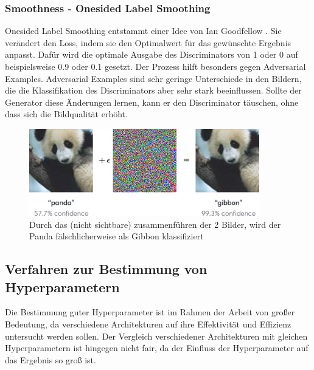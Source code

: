 \subsubsection{Smoothness - Onesided Label Smoothing}
Onesided Label Smoothing entstammt einer Idee von Ian Goodfellow \cite{ian-goodfellow-onesided-label-smoothing}.
Sie verändert den Loss, indem sie den Optimalwert für das gewünschte Ergebnis anpasst.
Dafür wird die optimale Ausgabe des Discriminators von 1 oder 0 auf beispielsweise 0.9 oder 0.1 gesetzt.
Der Prozess hilft besonders gegen Adversarial Examples.
Adversarial Examples sind sehr geringe Unterschiede in den Bildern, die die Klassifikation des Discriminators aber sehr stark beeinflussen.
Sollte der Generator diese Änderungen lernen, kann er den Discriminator täuschen, ohne dass sich die Bildqualität erhöht.

\begin{figure}[H]
	\centering
	\includegraphics[width=10cm]{kapitel/2_stand_der_technik/img/adversrial-example.png}
	\caption[Adversarial Example]{Durch das (nicht sichtbare) zusammenführen der 2 Bilder, wird der Panda fälschlicherweise als Gibbon klassifiziert}
	\label{smoothness-adversarial-example}
\end{figure}


\subsection{Verfahren zur Bestimmung von Hyperparametern}
\label{chapter:verfahren-bestimmung-hyperparameter}

Die Bestimmung guter Hyperparameter ist im Rahmen der Arbeit von großer Bedeutung, da verschiedene Architekturen auf ihre Effektivität und Effizienz untersucht werden sollen.
Der Vergleich verschiedener Architekturen mit gleichen Hyperparametern ist hingegen nicht fair, da der Einfluss der Hyperparameter auf das Ergebnis so groß ist.
\newline

